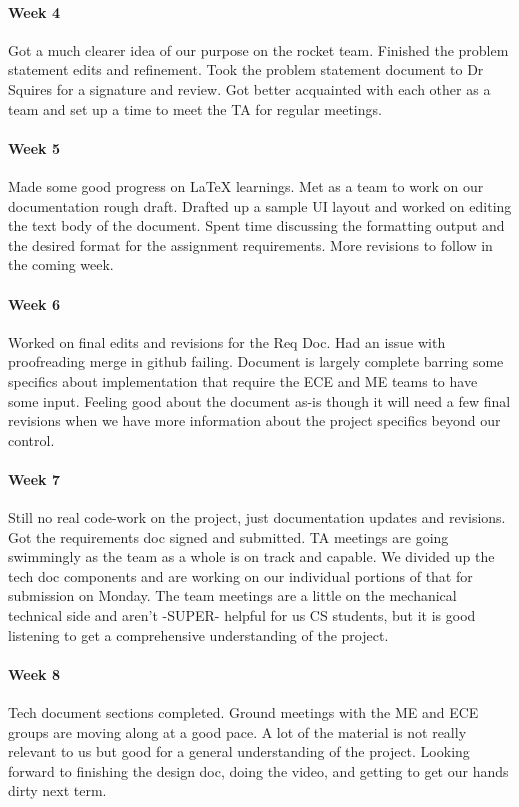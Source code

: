 \documentclass[10pt,draftclsnofoot,onecolumn,retainorgcmds]{IEEEtran}
\begin{document}
\paragraph{Week 4}
Got a much clearer idea of our purpose on the rocket team. Finished the problem statement edits and refinement. Took the problem statement document to Dr Squires for a signature and review. Got better acquainted with each other as a team and set up a time to meet the TA for regular meetings.\\
\paragraph{Week 5}
 Made some good progress on LaTeX learnings. Met as a team to work on our documentation rough draft. Drafted up a sample UI layout and worked on editing the text body of the document. Spent time discussing the formatting output and the desired format for the assignment requirements. More revisions to follow in the coming week.\\
\paragraph{Week 6}
Worked on final edits and revisions for the Req Doc. Had an issue with proofreading merge in github failing. Document is largely complete barring some specifics about implementation that require the ECE and ME teams to have some input. Feeling good about the document as-is though it will need a few final revisions when we have more information about the project specifics beyond our control.	\\
\paragraph{Week 7}
 Still no real code-work on the project, just documentation updates and revisions. Got the requirements doc signed and submitted. TA meetings are going swimmingly as the team as a whole is on track and capable. We divided up the tech doc components and are working on our individual portions of that for submission on Monday. The team meetings are a little on the mechanical technical side and aren't -SUPER- helpful for us CS students, but it is good listening to get a comprehensive understanding of the project.\\
\paragraph{Week 8}
Tech document sections completed. Ground meetings with the ME and ECE groups are moving along at a good pace. A lot of the material is not really relevant to us but good for a general understanding of the project. Looking forward to finishing the design doc, doing the video, and getting to get our hands dirty next term.	\\
\end{document}
